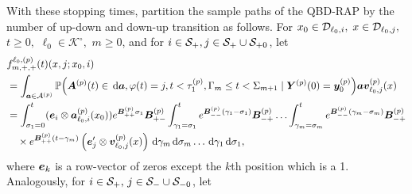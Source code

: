 With these stopping times, partition the sample paths of the QBD-RAP by the number of up-down and down-up transition as follows. For \(x_0\in\mathcal{D}_{\ell_0,i},\) \(x\in\mathcal{D}_{\ell_0,j},\) \(t\geq0,\) \(\ell_0\in\mathcal K^\circ,\) \(m\geq 0\), and for \(i\in\mathcal{S}_+,j\in\mathcal S_+\cup\mathcal S_{+0}\), let 
\begin{align}
	&f^{\ell_0,(p)}_{m,+,+}(t)( x,j; x_0,i)  \nonumber
	\\&=\int_{\boldsymbol a \in\mathcal A^{(p)}}\mathbb P\Big(\boldsymbol A^{(p)}(t)\in \, \mathrm{d} \boldsymbol a, \varphi(t) = j, t<\tau_1^{(p)}, \Gamma_m\leq t<\Sigma_{m+1} \nonumber
	\mid \boldsymbol Y^{(p)}(0)=\boldsymbol y_0^{(p)}\Big)
	\boldsymbol a{\boldsymbol v}_{\ell_0,j}^{(p)}(x) \nonumber
	\\
	&=\int_{\sigma_1=0}^t (\boldsymbol e_i\otimes \boldsymbol  a_{\ell_0,i}^{(p)}(x_0)) e^{\boldsymbol{B}^{(p)}_{++}\sigma_1}\boldsymbol{B}^{(p)}_{+-}	\nonumber
	\int_{\gamma_1=\sigma_1}^{t} e^{\boldsymbol{B}^{(p)}_{--}(\gamma_1-\sigma_1)}\boldsymbol{B}^{(p)}_{-+}
	\hdots 
	 \int_{\gamma_m=\sigma_{m}}^{t} e^{\boldsymbol{B}^{(p)}_{--}(\gamma_m-\sigma_{m})}\boldsymbol{B}^{(p)}_{-+}\\&\quad\times
	e^{\boldsymbol{B}^{(p)}_{++}(t-\gamma_m)}\left(\boldsymbol e_j'{}  \otimes {\boldsymbol v}_{\ell_0,j}^{(p)}(x)\right) 
	\, \mathrm{d} \gamma_m\, \mathrm{d} \sigma_m\dots \, \mathrm{d} \gamma_1\, \mathrm{d} \sigma_1 , \label{eqn: approx end conv}
\end{align}
where \(\boldsymbol e_k\) is a row-vector of zeros except the \(k\)th position which is a 1. 
Analogously, for \(i\in\mathcal S_+ ,\,j\in\mathcal{S}_{-}\cup\mathcal S_{-0}\), let 
